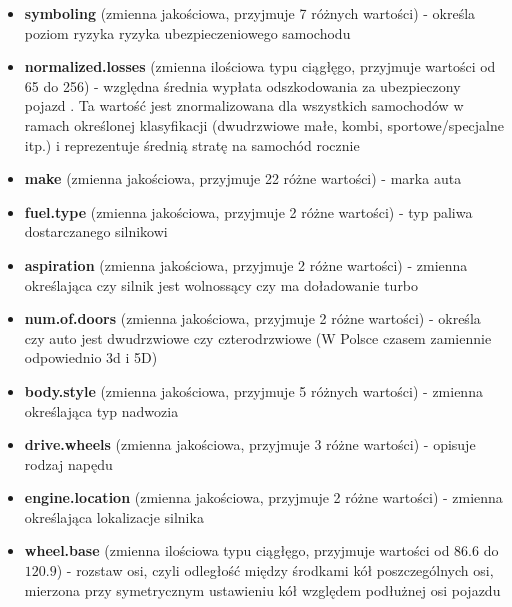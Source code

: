 \documentclass[12pt, a4paper]{article}\usepackage[]{graphicx}\usepackage[]{xcolor}
\begin{document}
\begin{itemize}
\item \textbf{symboling} (zmienna jakościowa, przyjmuje 7 różnych wartości) -  określa poziom ryzyka ryzyka ubezpieczeniowego samochodu
\item \textbf{normalized.losses} (zmienna ilościowa typu ciągłęgo, przyjmuje wartości od 65 do 256) - względna średnia wypłata odszkodowania za ubezpieczony pojazd . Ta wartość jest znormalizowana dla wszystkich samochodów w ramach określonej klasyfikacji (dwudrzwiowe małe, kombi, sportowe/specjalne itp.) i reprezentuje średnią stratę na samochód rocznie
\item \textbf{make} (zmienna jakościowa, przyjmuje 22 różne wartości) - marka auta
\item \textbf{fuel.type} (zmienna jakościowa, przyjmuje 2 różne wartości) - typ paliwa dostarczanego silnikowi
\item \textbf{aspiration} (zmienna jakościowa, przyjmuje 2 różne wartości) - zmienna określająca czy silnik jest wolnossący czy ma doładowanie turbo
\item \textbf{num.of.doors} (zmienna jakościowa, przyjmuje 2 różne wartości) - określa czy auto jest dwudrzwiowe czy czterodrzwiowe (W Polsce czasem zamiennie odpowiednio 3d i 5D)
\item \textbf{body.style} (zmienna jakościowa, przyjmuje 5 różnych wartości) - zmienna określająca typ nadwozia
\item \textbf{drive.wheels} (zmienna jakościowa, przyjmuje 3 różne wartości) - opisuje rodzaj napędu
\item \textbf{engine.location} (zmienna jakościowa, przyjmuje 2 różne wartości) - zmienna określająca lokalizacje silnika
\item \textbf{wheel.base} (zmienna ilościowa typu ciągłęgo, przyjmuje wartości od $86.6$ do $120.9$) - rozstaw osi, czyli odległość między środkami kół poszczególnych osi, mierzona przy symetrycznym ustawieniu kół względem podłużnej osi pojazdu


\end{itemize}
\end{document}
